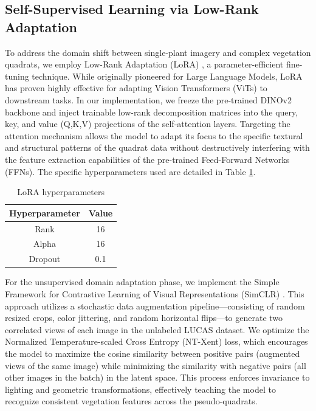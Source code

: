 \documentclass[conference]{IEEEtran}
\begin{document}
\subsection{Self-Supervised Learning via Low-Rank Adaptation}

To address the domain shift between single-plant imagery and complex vegetation quadrats, we employ Low-Rank Adaptation (LoRA) \cite{hu2021loralowrankadaptationlarge}, a parameter-efficient fine-tuning technique. While originally pioneered for Large Language Models, LoRA has proven highly effective for adapting Vision Transformers (ViTs) to downstream tasks. In our implementation, we freeze the pre-trained DINOv2 backbone and inject trainable low-rank decomposition matrices into the query, key, and value (Q,K,V) projections of the self-attention layers. Targeting the attention mechanism allows the model to adapt its focus to the specific textural and structural patterns of the quadrat data without destructively interfering with the feature extraction capabilities of the pre-trained Feed-Forward Networks (FFNs). The specific hyperparameters used are detailed in Table \ref{tab:lora_config}.
\begin{table}[H]
\centering
\caption{LoRA hyperparameters}
\label{tab:lora_config}
\begin{tabular}{@{}cc@{}}
\toprule
\textbf{Hyperparameter} & \textbf{Value} \\ \midrule
Rank                    & 16             \\
Alpha                   & 16             \\
Dropout                 & 0.1            \\ \bottomrule
\end{tabular}
\end{table}

For the unsupervised domain adaptation phase, we implement the Simple Framework for Contrastive Learning of Visual Representations (SimCLR) \cite{chen2020simpleframeworkcontrastivelearning}. This approach utilizes a stochastic data augmentation pipeline—consisting of random resized crops, color jittering, and random horizontal flips—to generate two correlated views of each image in the unlabeled LUCAS dataset. We optimize the Normalized Temperature-scaled Cross Entropy (NT-Xent) loss, which encourages the model to maximize the cosine similarity between positive pairs (augmented views of the same image) while minimizing the similarity with negative pairs (all other images in the batch) in the latent space. This process enforces invariance to lighting and geometric transformations, effectively teaching the model to recognize consistent vegetation features across the pseudo-quadrats.
\end{document}
